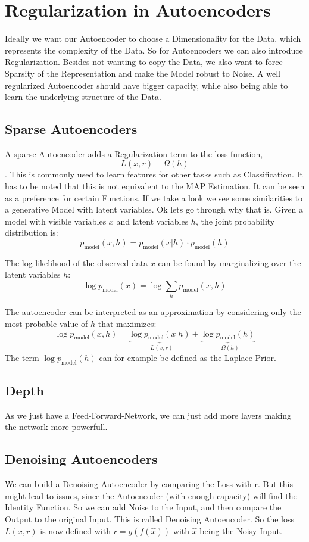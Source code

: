 \documentclass[a4paper]{article}
\begin{document}
\section{Regularization in Autoencoders}
Ideally we want our Autoencoder to choose a Dimensionality for the Data, which represents the complexity of the Data. So for Autoencoders we can also introduce Regularization. Besides not wanting to copy the Data, we also want to force Sparsity of the Representation and make the Model robust to Noise. A well regularized Autoencoder
should have bigger capacity, while also being able to learn the underlying structure of the Data.

\subsection{Sparse Autoencoders}
A sparse Autoencoder adds a Regularization term to the loss function, \[ L(x, r) + \Omega(h) \]. This is commonly used to learn features for other tasks
such as Classification. It has to be noted that this is not equivalent to the MAP Estimation. It can be seen as a preference for certain Functions. If we take a look we see some similarities to a generative Model with latent variables. Ok lets go through why that is. 
Given a model with visible variables \( x \) and latent variables \( h \), the joint probability distribution is:
\[
p_{\text{model}}(x, h) = p_{\text{model}}(x|h) \cdot p_{\text{model}}(h)
\]

The log-likelihood of the observed data \( x \) can be found by marginalizing over the latent variables \( h \):
\[
\log p_{\text{model}}(x) = \log \sum_h p_{\text{model}}(x, h)
\]

The autoencoder can be interpreted as an approximation by considering only the most probable value of \( h \) that maximizes:
\[
\log p_{\text{model}}(x, h) = \underbrace{\log p_{\text{model}}(x|h)}_{-L(x,r)} + \underbrace{\log p_{\text{model}}(h)}_{-\Omega(h)}
\]
The term $\log p_{\text{model}}(h)$ can for example be defined as the Laplace Prior. 

\subsection{Depth}
As we just have a Feed-Forward-Network, we can just add more layers making the network more powerfull. 

\subsection{Denoising Autoencoders}
We can build a Denoising Autoencoder by comparing the Loss with r. But this might lead to issues, since the 
Autoencoder (with enough capacity) will find the Identity Function. So we can add Noise to the Input, and then compare the Output to the original Input. This is called Denoising Autoencoder. So the loss $ L(x, r)$ is now defined with $r = g(f(\hat{x}))$ with $\hat{x}$ being the Noisy Input.
\end{document}
